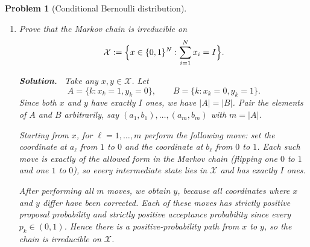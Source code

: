 \documentclass[11pt]{article}
\newtheorem{problem}{Problem}
\newenvironment{solution}{\par\noindent\textbf{Solution.}\ }{\par}
\begin{document}
\begin{problem}[Conditional Bernoulli distribution]
\begin{enumerate}
\begin{solution}
Let $x \in \mathcal{X}$ be the current state and let $y$ be obtained by changing
$x_i = 0$ to $y_i = 1$ and $x_j = 1$ to $y_j = 0$, for some
$i \in S_0(x)$ and $j \in S_1(x)$. Since $|S_0(x)| = N-I$ and
$|S_1(x)| = I$, the proposal probability is
\[
  q(x,y) = \frac{1}{|S_0(x)|}\,\frac{1}{|S_1(x)|}
         = \frac{1}{(N-I)I}.
\]
The reverse move $y \to x$ has the same proposal probability, so
$q(y,x) = q(x,y)$. The proposal is therefore symmetric, and the MH acceptance
probability is
\[
  \alpha(x,y) = \min\Bigl\{1,\, \frac{\pi(y)}{\pi(x)}\Bigr\}.
\]
Since $\pi$ is only defined up to a normalizing constant, we can write
\[
  \pi(x) \propto \prod_{k=1}^N p_k^{x_k}(1-p_k)^{1-x_k}
\]
on $\mathcal{X}$, and the constant drops out in the ratio. Only coordinates $i$
and $j$ change, so
\[
  \frac{\pi(y)}{\pi(x)}
  = \frac{p_i^{y_i}(1-p_i)^{1-y_i} p_j^{y_j}(1-p_j)^{1-y_j}}
         {p_i^{x_i}(1-p_i)^{1-x_i} p_j^{x_j}(1-p_j)^{1-x_j}}
  = \frac{p_i}{1-p_i} \cdot \frac{1-p_j}{p_j}.
\]
Thus
\[
  \alpha(x,y) = \min\left\{1,\,
      \frac{p_i}{1-p_i}\cdot\frac{1-p_j}{p_j}
    \right\}.
\]
\qedhere
\end{solution}

\item Prove that the Markov chain is irreducible on
\[
  \mathcal{X} := \Bigl\{x \in \{0,1\}^N : \sum_{i=1}^N x_i = I\Bigr\}.
\]

\begin{solution}
Take any $x,y \in \mathcal{X}$. Let
\[
  A = \{k : x_k = 1, y_k = 0\}, \qquad
  B = \{k : x_k = 0, y_k = 1\}.
\]
Since both $x$ and $y$ have exactly $I$ ones, we have $|A| = |B|$. Pair the
elements of $A$ and $B$ arbitrarily, say $(a_1,b_1),\dots,(a_m,b_m)$ with
$m = |A|$.

Starting from $x$, for $\ell = 1,\dots,m$ perform the following move: set the
coordinate at $a_\ell$ from $1$ to $0$ and the coordinate at $b_\ell$ from $0$ to
$1$. Each such move is exactly of the allowed form in the Markov chain (flipping
one $0$ to $1$ and one $1$ to $0$), so every intermediate state lies in
$\mathcal{X}$ and has exactly $I$ ones.

After performing all $m$ moves, we obtain $y$, because all coordinates where $x$
and $y$ differ have been corrected. Each of these moves has strictly positive
proposal probability and strictly positive acceptance probability since every
$p_k \in (0,1)$. Hence there is a positive-probability path from $x$ to $y$, so
the chain is irreducible on $\mathcal{X}$.\qedhere
\end{solution}


\end{enumerate}
\end{problem}
\end{document}
